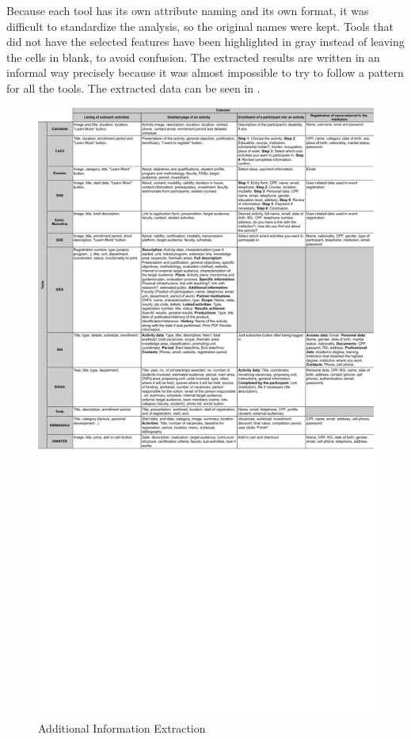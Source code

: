 Because each tool has its own attribute naming and its own format, it was difficult to standardize the analysis, so the original names were kept. Tools that did not have the selected features have been highlighted in gray instead of leaving the cells in blank, to avoid confusion. The extracted results are written in an informal way precisely because it was almost impossible to try to follow a pattern for all the tools. The extracted data can be seen in .

\begin{figure}[htb]
  \caption{Additional Information Extraction}\label{fig:gl-additional-extraction}
  \begin{center}
    \includegraphics[width=16cm]{img/gl-data-extraction-2.pdf}
  \end{center}
\end{figure}

